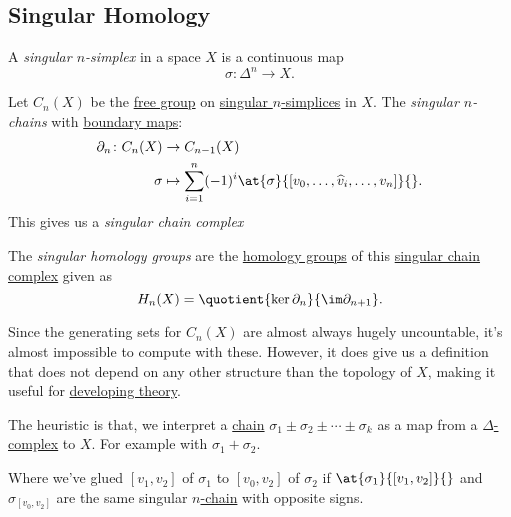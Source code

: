 \subsection{Singular Homology}
\begin{definition}\label{def:singular-simplex}
	A \emph{singular \(n\)-simplex} in a space \(X\) is a continuous map
	\[
		\sigma \colon \Delta^n \to X.
	\]
\end{definition}

\begin{definition}\label{def:singular-chain}
	Let \(C_n(X)\) be the \hyperref[def:free-group]{free group} on \hyperref[def:singular-simplex]{singular \(n\)-simplices} in \(X\).
	The \emph{singular \(n\)-chains} with \hyperref[def:boundary-homomorphism]{boundary maps}:
	\[
		\begin{split}
			\partial_n \colon C_n(X) & \to C_{n - 1}(X)                                                                       \\
			\sigma              & \mapsto \sum_{i = 1}^n (-1)^i \at{\sigma}{[v_0, \ldots, \widehat{v}_i, \ldots, v_n]}{}.
		\end{split}
	\]
	This gives us a \emph{singular chain complex}
\end{definition}

\begin{definition}\label{def:singular-homology-group}
	The \emph{singular homology groups} are the \hyperref[def:homology-group]{homology groups} of this \hyperref[def:singular-chain]{singular chain complex} given as
	\[
		H_n(X) = \quotient{\ker \partial_n}{\im \partial_{n + 1}}.
	\]
\end{definition}

Since the generating sets for \(C_n(X)\) are almost always hugely uncountable, it's almost impossible to compute with these. However, it does give us a
definition that does not depend on any other structure than the topology of $X$, making it useful for \underline{developing theory}.

\begin{note}
	The heuristic is that, we interpret a \hyperref[def:chain-complex]{chain} $\sigma_1 \pm \sigma_2 \pm \cdots \pm \sigma_k$ as a map from a \hyperref[def:delta-complex]{\(\Delta\)-complex} to \(X\).
	For example with \(\sigma_1 + \sigma_2\).
\end{note}

Where we've glued $[v_1, v_2]$ of $\sigma_1$ to $[v_0, v_2]$ of $\sigma_2$ if $\at{\sigma_1}{[v_1, v_2]}{}$ and $\sigma_{[v_0, v_2]}$ are the same singular \hyperref[def:chain-group]{\(n\)-chain}
with opposite signs.

